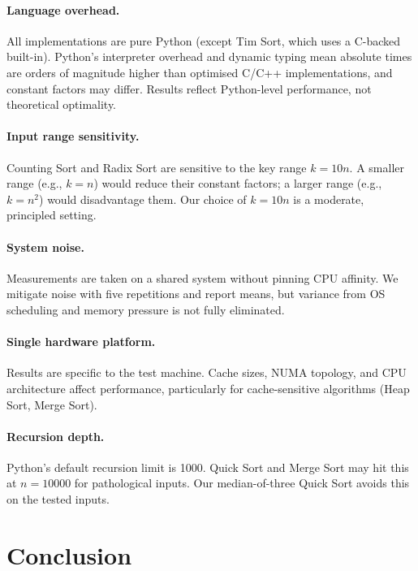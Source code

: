 \documentclass[11pt,a4paper]{article}
\begin{document}
\paragraph{Language overhead.}
All implementations are pure Python (except Tim Sort, which uses a C-backed built-in).
Python's interpreter overhead and dynamic typing mean absolute times are orders of
magnitude higher than optimised C/C++ implementations, and constant factors may differ.
Results reflect Python-level performance, not theoretical optimality.

\paragraph{Input range sensitivity.}
Counting Sort and Radix Sort are sensitive to the key range $k = 10n$.
A smaller range (e.g., $k = n$) would reduce their constant factors; a larger range
(e.g., $k = n^2$) would disadvantage them.
Our choice of $k = 10n$ is a moderate, principled setting.

\paragraph{System noise.}
Measurements are taken on a shared system without pinning CPU affinity.
We mitigate noise with five repetitions and report means, but variance from OS scheduling
and memory pressure is not fully eliminated.

\paragraph{Single hardware platform.}
Results are specific to the test machine. Cache sizes, NUMA topology, and CPU
architecture affect performance, particularly for cache-sensitive algorithms (Heap Sort,
Merge Sort).

\paragraph{Recursion depth.}
Python's default recursion limit is 1000. Quick Sort and Merge Sort may hit this at
$n = 10000$ for pathological inputs. Our median-of-three Quick Sort avoids this on
the tested inputs.

\section{Conclusion}
\label{sec:conclusion}
\end{document}
